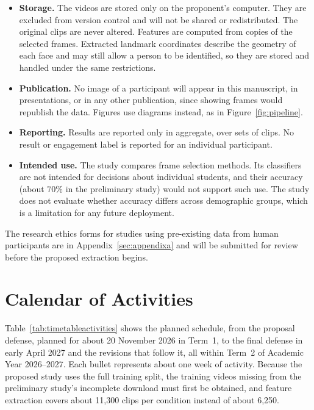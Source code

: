 \begin{itemize}
   \item \textbf{Storage.} The videos are stored only on the proponent's computer. They are excluded from version control and will not be shared or redistributed. The original clips are never altered. Features are computed from copies of the selected frames. Extracted landmark coordinates describe the geometry of each face and may still allow a person to be identified, so they are stored and handled under the same restrictions.
   \item \textbf{Publication.} No image of a participant will appear in this manuscript, in presentations, or in any other publication, since showing frames would republish the data. Figures use diagrams instead, as in Figure~\ref{fig:pipeline}.
   \item \textbf{Reporting.} Results are reported only in aggregate, over sets of clips. No result or engagement label is reported for an individual participant.
   \item \textbf{Intended use.} The study compares frame selection methods. Its classifiers are not intended for decisions about individual students, and their accuracy (about 70\% in the preliminary study) would not support such use. The study does not evaluate whether accuracy differs across demographic groups, which is a limitation for any future deployment.
\end{itemize}

The research ethics forms for studies using pre-existing data from human participants are in Appendix~\ref{sec:appendixa} and will be submitted for review before the proposed extraction begins.



\section{Calendar of Activities}
\label{sec:calendar}

Table~\ref{tab:timetableactivities} shows the planned schedule, from the proposal defense, planned for about 20 November 2026 in Term~1, to the final defense in early April 2027 and the revisions that follow it, all within Term~2 of Academic Year 2026--2027. Each bullet represents about one week of activity. Because the proposed study uses the full training split, the training videos missing from the preliminary study's incomplete download must first be obtained, and feature extraction covers about 11,300 clips per condition instead of about 6,250.

